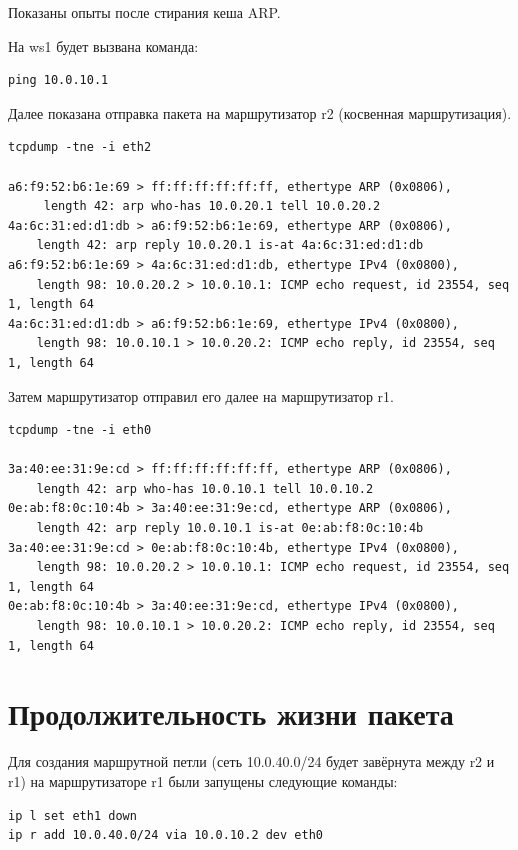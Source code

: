 \documentclass[a4paper,12pt]{article}
\begin{document}
Показаны опыты после стирания кеша ARP.

На ws1 будет вызвана команда:
\begin{Verbatim}
ping 10.0.10.1
\end{Verbatim}

Далее показана отправка пакета на маршрутизатор r2 (косвенная маршрутизация). 

\begin{Verbatim}
tcpdump -tne -i eth2

a6:f9:52:b6:1e:69 > ff:ff:ff:ff:ff:ff, ethertype ARP (0x0806), 
     length 42: arp who-has 10.0.20.1 tell 10.0.20.2
4a:6c:31:ed:d1:db > a6:f9:52:b6:1e:69, ethertype ARP (0x0806), 
    length 42: arp reply 10.0.20.1 is-at 4a:6c:31:ed:d1:db
a6:f9:52:b6:1e:69 > 4a:6c:31:ed:d1:db, ethertype IPv4 (0x0800), 
    length 98: 10.0.20.2 > 10.0.10.1: ICMP echo request, id 23554, seq 1, length 64
4a:6c:31:ed:d1:db > a6:f9:52:b6:1e:69, ethertype IPv4 (0x0800), 
    length 98: 10.0.10.1 > 10.0.20.2: ICMP echo reply, id 23554, seq 1, length 64
\end{Verbatim}

Затем маршрутизатор отправил его далее на маршрутизатор r1.

\begin{Verbatim}
tcpdump -tne -i eth0

3a:40:ee:31:9e:cd > ff:ff:ff:ff:ff:ff, ethertype ARP (0x0806), 
    length 42: arp who-has 10.0.10.1 tell 10.0.10.2
0e:ab:f8:0c:10:4b > 3a:40:ee:31:9e:cd, ethertype ARP (0x0806), 
    length 42: arp reply 10.0.10.1 is-at 0e:ab:f8:0c:10:4b
3a:40:ee:31:9e:cd > 0e:ab:f8:0c:10:4b, ethertype IPv4 (0x0800), 
    length 98: 10.0.20.2 > 10.0.10.1: ICMP echo request, id 23554, seq 1, length 64
0e:ab:f8:0c:10:4b > 3a:40:ee:31:9e:cd, ethertype IPv4 (0x0800), 
    length 98: 10.0.10.1 > 10.0.20.2: ICMP echo reply, id 23554, seq 1, length 64
\end{Verbatim}

\section{Продолжительность жизни пакета}

Для создания маршрутной петли (сеть 10.0.40.0/24 будет завёрнута между r2 и r1) на маршрутизаторе r1 были запущены следующие команды:

\begin{Verbatim}
ip l set eth1 down
ip r add 10.0.40.0/24 via 10.0.10.2 dev eth0
\end{Verbatim}
\end{document}
